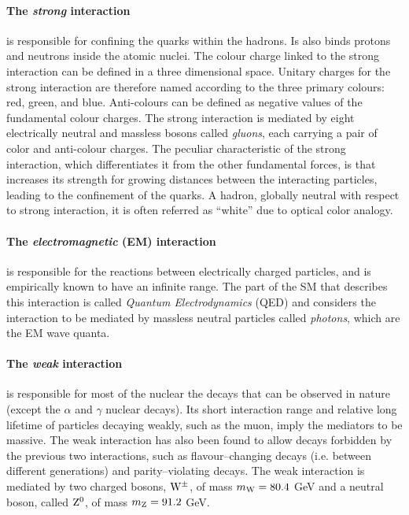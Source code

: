 \paragraph{The \emph{strong} interaction} is responsible for confining the quarks within the hadrons. Is also binds protons and neutrons inside the atomic nuclei. The colour charge linked to the strong interaction can be defined in a three dimensional space. Unitary charges for the strong interaction are therefore named according to the three primary colours: red, green, and blue. Anti-colours can be defined as negative values of the fundamental colour charges. The strong interaction is mediated by eight electrically neutral and massless bosons called \emph{gluons}, each carrying a pair of color and anti-colour charges. The peculiar characteristic of the strong interaction, which differentiates it from the other fundamental forces, is that increases its strength for growing distances between the interacting particles, leading to the confinement of the quarks. A hadron, globally neutral with respect to strong interaction, it is often referred as ``white'' due to optical color analogy.

\paragraph{The \emph{electromagnetic} (EM) interaction} is responsible for the reactions between electrically charged particles, and is empirically known to have an infinite range. The part of the SM that describes this interaction is called \emph{Quantum Electrodynamics} (QED) and considers the interaction to be mediated by massless neutral particles called \emph{photons}, which are the EM wave quanta.

\paragraph{The \emph{weak} interaction} is responsible for most of the nuclear the decays that can be observed in nature (except the $\alpha$ and $\gamma$ nuclear decays). Its short interaction range and relative long lifetime of particles decaying weakly, such as the muon, imply the mediators to be massive. The weak interaction has also been found to allow decays forbidden by the previous two interactions, such as flavour--changing decays (i.e. between different generations) and parity--violating decays. The weak interaction is mediated by two charged bosons, $\mathrm{W}^\pm$, of mass $m_{\mathrm{W}} = 80.4$ GeV and a neutral boson, called $\mathrm{Z}^{0}$, of mass $m_{\mathrm{Z}} = 91.2$ GeV.

